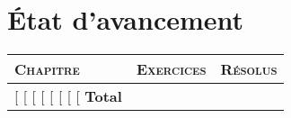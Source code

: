 \chapter*{État d'avancement}

\begin{center}
\begin{tabular}{lrr}
\toprule
\textsc{Chapitre} & \textsc{Exercices} & \textsc{Résolus} \\
\midrule
[%
  [%
  [%
    [%
  [%
  [%
  [%
[%
\midrule
  \textbf{Total} & 
  \textbf{[%
  \textbf{[%
\bottomrule
\end{tabular}
\end{center}
